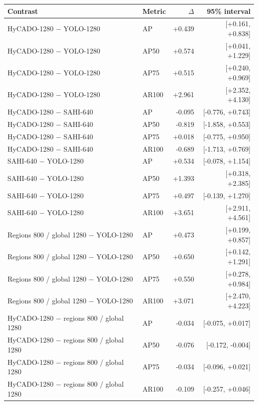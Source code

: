 \begin{tabular}{llrr}
\toprule
Contrast & Metric & $\Delta$ & 95\% interval\\
\midrule
HyCADO-1280 $-$ YOLO-1280 & AP & +0.439 & [+0.161, +0.838]\\
HyCADO-1280 $-$ YOLO-1280 & AP50 & +0.574 & [+0.041, +1.229]\\
HyCADO-1280 $-$ YOLO-1280 & AP75 & +0.515 & [+0.240, +0.969]\\
HyCADO-1280 $-$ YOLO-1280 & AR100 & +2.961 & [+2.352, +4.130]\\
HyCADO-1280 $-$ SAHI-640 & AP & -0.095 & [-0.776, +0.743]\\
HyCADO-1280 $-$ SAHI-640 & AP50 & -0.819 & [-1.858, +0.553]\\
HyCADO-1280 $-$ SAHI-640 & AP75 & +0.018 & [-0.775, +0.950]\\
HyCADO-1280 $-$ SAHI-640 & AR100 & -0.689 & [-1.713, +0.769]\\
SAHI-640 $-$ YOLO-1280 & AP & +0.534 & [-0.078, +1.154]\\
SAHI-640 $-$ YOLO-1280 & AP50 & +1.393 & [+0.318, +2.385]\\
SAHI-640 $-$ YOLO-1280 & AP75 & +0.497 & [-0.139, +1.270]\\
SAHI-640 $-$ YOLO-1280 & AR100 & +3.651 & [+2.911, +4.561]\\
Regions 800 / global 1280 $-$ YOLO-1280 & AP & +0.473 & [+0.199, +0.857]\\
Regions 800 / global 1280 $-$ YOLO-1280 & AP50 & +0.650 & [+0.142, +1.291]\\
Regions 800 / global 1280 $-$ YOLO-1280 & AP75 & +0.550 & [+0.278, +0.984]\\
Regions 800 / global 1280 $-$ YOLO-1280 & AR100 & +3.071 & [+2.470, +4.223]\\
HyCADO-1280 $-$ regions 800 / global 1280 & AP & -0.034 & [-0.075, +0.017]\\
HyCADO-1280 $-$ regions 800 / global 1280 & AP50 & -0.076 & [-0.172, -0.004]\\
HyCADO-1280 $-$ regions 800 / global 1280 & AP75 & -0.034 & [-0.096, +0.021]\\
HyCADO-1280 $-$ regions 800 / global 1280 & AR100 & -0.109 & [-0.257, +0.046]\\
\bottomrule
\end{tabular}
